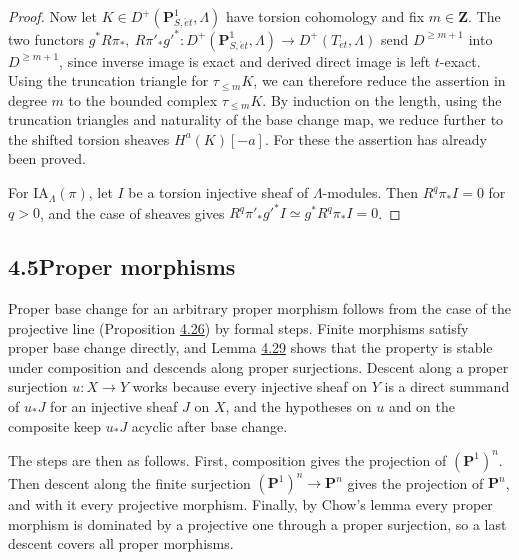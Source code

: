 \documentclass[11pt]{article}
\begin{document}
\begin{proof}[{Proof}]
Now let \(K\in D^+(\mathbf P^1_{S,\acute{e}t},\Lambda)\) have torsion cohomology and fix \(m\in\mathbf Z\). The two functors \(g^*R\pi_*,\ R\pi'_*g'^*:D^+(\mathbf P^1_{S,\acute{e}t},\Lambda)\to
D^+(T_{\acute{e}t},\Lambda)\) send \(D^{\geq m+1}\) into \(D^{\geq m+1}\), since inverse image is exact and derived direct image is left \(t\)-exact. Using the truncation triangle for \(\tau_{\leq m}K\), we can therefore reduce the assertion in degree \(m\) to the bounded complex \(\tau_{\leq m}K\). By induction on the length, using the truncation triangles and naturality of the base change map, we reduce further to the shifted torsion sheaves \(H^a(K)[-a]\). For these the assertion has already been proved.

For \(\mathrm{IA}_\Lambda(\pi)\), let \(I\) be a torsion injective sheaf of \(\Lambda\)-modules. Then \(R^q\pi_*I=0\) for \(q>0\), and the case of sheaves gives \(R^q\pi'_*g'^*I\simeq g^*R^q\pi_*I=0\).
\end{proof}



\subsection*{\texorpdfstring{4.5\quad Proper morphisms}{4.5 Proper morphisms}}
\label{bp362}%
\label{bp363}%
Proper base change for an arbitrary proper morphism follows from the case of the projective line (Proposition \hyperref[bp360]{4.26}) by formal steps. Finite morphisms satisfy proper base change directly, and Lemma \hyperref[bp369]{4.29} shows that the property is stable under composition and descends along proper surjections. Descent along a proper surjection \(u:X\to Y\) works because every injective sheaf on \(Y\) is a direct summand of \(u_*J\) for an injective sheaf \(J\) on \(X\), and the hypotheses on \(u\) and on the composite keep \(u_*J\) acyclic after base change.

The steps are then as follows. First, composition gives the projection of \((\mathbf P^1)^n\). Then descent along the finite surjection \((\mathbf P^1)^n\to\mathbf P^n\) gives the projection of \(\mathbf P^n\), and with it every projective morphism. Finally, by Chow's lemma every proper morphism is dominated by a projective one through a proper surjection, so a last descent covers all proper morphisms.
\end{document}

